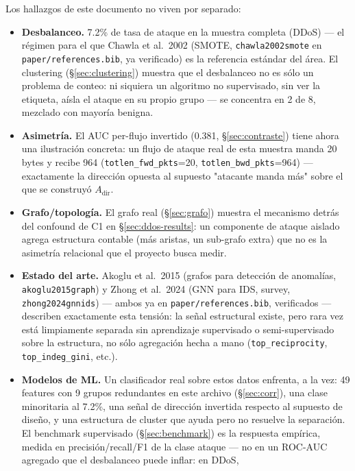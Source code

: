 \documentclass[11pt]{article}
\newcommand{\code}[1]{\texttt{\small #1}}
\begin{document}
Los hallazgos de este documento no viven por separado:

\begin{itemize}[leftmargin=1.4em]
\item \textbf{Desbalanceo.} 7.2\% de tasa de ataque en la muestra completa (DDoS) --- el
  régimen para el que Chawla et al.\ 2002 (SMOTE, \code{chawla2002smote} en
  \code{paper/references.bib}, ya verificado) es la referencia estándar del área. El clustering
  (\S\ref{sec:clustering}) muestra que el desbalanceo no es sólo un problema de conteo: ni
  siquiera un algoritmo no supervisado, sin ver la etiqueta, aísla el ataque en su propio
  grupo --- se concentra en 2 de 8, mezclado con mayoría benigna.
\item \textbf{Asimetría.} El AUC per-flujo invertido (0.381, \S\ref{sec:contraste}) tiene
  ahora una ilustración concreta: un flujo de ataque real de esta muestra manda 20 bytes y
  recibe 964 (\code{totlen\_fwd\_pkts}=20, \code{totlen\_bwd\_pkts}=964) --- exactamente la
  dirección opuesta al supuesto "atacante manda más" sobre el que se construyó
  $A_{\text{dir}}$.
\item \textbf{Grafo/topología.} El grafo real (\S\ref{sec:grafo}) muestra el mecanismo
  detrás del confound de C1 en \S\ref{sec:ddos-results}: un componente de ataque aislado
  agrega estructura contable (más aristas, un sub-grafo extra) que no es la asimetría
  relacional que el proyecto busca medir.
\item \textbf{Estado del arte.} Akoglu et al.\ 2015 (grafos para detección de anomalías,
  \code{akoglu2015graph}) y Zhong et al.\ 2024 (GNN para IDS, survey,
  \code{zhong2024gnnids}) --- ambos ya en \code{paper/references.bib}, verificados ---
  describen exactamente esta tensión: la señal
  estructural existe, pero rara vez está limpiamente separada sin aprendizaje supervisado o
  semi-supervisado sobre la estructura, no sólo agregación hecha a mano
  (\code{top\_reciprocity}, \code{top\_indeg\_gini}, etc.).
\item \textbf{Modelos de ML.} Un clasificador real sobre estos datos enfrenta, a la vez:
  49 features con 9 grupos redundantes en este archivo (\S\ref{sec:corr}), una clase minoritaria al 7.2\%,
  una señal de dirección invertida respecto al supuesto de diseño, y una estructura de
  cluster que ayuda pero no resuelve la separación. El benchmark supervisado
  (\S\ref{sec:benchmark}) es la respuesta empírica, medida en precisión/recall/F1 de la
  clase ataque --- no en un ROC-AUC agregado que el desbalanceo puede inflar: en DDoS,

\end{itemize}
\end{document}

